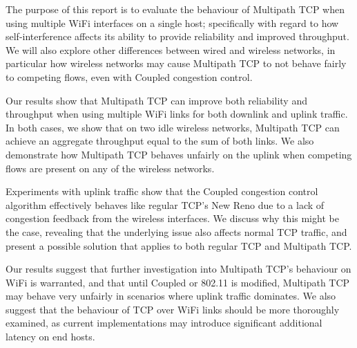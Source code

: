 \documentclass[12pt,a4paper]{article}
\begin{document}
The purpose of this report is to evaluate the behaviour of Multipath TCP when
using multiple WiFi interfaces on a single host; specifically with regard to
how self-interference affects its ability to provide reliability and improved
throughput. We will also explore other differences between wired and wireless
networks, in particular how wireless networks may cause Multipath TCP to not
behave fairly to competing flows, even with Coupled congestion control.

Our results show that Multipath TCP can improve both reliability and throughput
when using multiple WiFi links for both downlink and uplink traffic. In both
cases, we show that on two idle wireless networks, Multipath TCP can achieve an
aggregate throughput equal to the sum of both links. We also demonstrate how
Multipath TCP behaves unfairly on the uplink when competing flows are present on
any of the wireless networks.

Experiments with uplink traffic show that the Coupled congestion control
algorithm effectively behaves like regular TCP's New Reno due to a lack of
congestion feedback from the wireless interfaces. We discuss why this might be
the case, revealing that the underlying issue also affects normal TCP traffic,
and present a possible solution that applies to both regular TCP and Multipath
TCP.

Our results suggest that further investigation into Multipath TCP's behaviour on
WiFi is warranted, and that until Coupled or 802.11 is modified, Multipath TCP
may behave very unfairly in scenarios where uplink traffic dominates. We also
suggest that the behaviour of TCP over WiFi links should be more thoroughly
examined, as current implementations may introduce significant additional
latency on end hosts.
\end{document}
